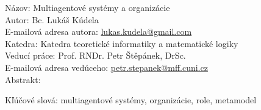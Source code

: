 
\frenchspacing

Názov: Multiagentové systémy a organizácie\\
Autor: Bc. Lukáš Kúdela\\
E-mailová adresa autora: \url{lukas.kudela@gmail.com}\\
Katedra: Katedra teoretické informatiky a matematické logiky\\
Veducí práce: Prof. RNDr. Petr Štěpánek, DrSc.\\
E-mailová adresa vedúceho: \url{petr.stepanek@mff.cuni.cz}\\

Abstrakt:





Kľúčové slová: multiagentové systémy, organizácie, role, metamodel

\nonfrenchspacing